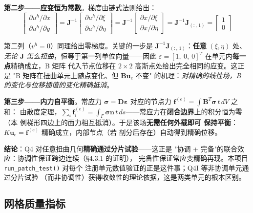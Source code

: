 \documentclass[12pt,a4paper]{ctexart}
\newcommand{\fem}{\Verb}
\begin{document}
\textbf{第二步——应变恒为常数}。梯度由链式法则给出：
\begin{equation}
\begin{bmatrix} \partial u^h/\partial x \\ \partial u^h/\partial y \end{bmatrix}
= \mathbf{J}^{-1}
\begin{bmatrix} \partial u^h/\partial \xi \\ \partial u^h/\partial \eta \end{bmatrix}
= \mathbf{J}^{-1}
\begin{bmatrix} \partial x/\partial \xi \\ \partial x/\partial \eta \end{bmatrix}
= \mathbf{J}^{-1} \mathbf{J}_{(:,\,1)} = \begin{bmatrix} 1 \\ 0 \end{bmatrix}
\end{equation}

第二列（$v^h = 0$）同理给出零梯度。关键的一步是
$\mathbf{J}^{-1}\mathbf{J}_{(:,\,1)}$：\textbf{任意} $(\xi,\eta)$ 处、
\emph{无论 $\mathbf{J}$ 怎么扭曲}，恒等于第一列单位向量——因此
$\varepsilon = [1,\ 0,\ 0]^T$ 在单元内\textbf{每一点}精确成立，B 矩阵
代入节点位移在 $2\times2$ 高斯点处给出完全相同的应变。这正是
"B 矩阵在扭曲单元上随点变化、但 $\mathbf{B}\mathbf{u}_e$ 不变"
的机理：\emph{对精确的线性场，B 的变化与位移插值的变化精确抵消}。

\textbf{第三步——内力自平衡}。常应力 $\boldsymbol{\sigma} =
\mathbf{D}\boldsymbol{\varepsilon}$ 对应的节点力
$\mathbf{f}^{(e)} = \int \mathbf{B}^T \boldsymbol{\sigma}\,t\,dV$ 之和：
由散度定理，$\sum_i \mathbf{f}_i^{(e)} = \int_\Gamma \boldsymbol{\sigma}
\mathbf{n}\,t\,ds$——常应力在\textbf{闭合边界}上的积分恒为零（本
例梯形四边上的面力相互抵消）。于是该场\textbf{无需任何外载即可
保持平衡}：$K\mathbf{u}_e = \mathbf{f}^{(e)}$ 精确成立，内部节点（若
剖分后存在）自动得到精确位移。

\textbf{结论}：Q4 对任意扭曲几何\textbf{精确通过分片试验}——这正是
"协调 + 完备"的联合效应：协调性保证跨边连续（§4.3.1 的证明），
完备性保证常应变精确再现。本项目 \fem|run_patch_test()| 对每个
注册单元数值验证的正是这件事；Q4I 等非协调单元通过分片试验
（而非协调性）获得收敛性的理论依据，这是两类单元的根本区别。

\subsection{网格质量指标}
\end{document}
